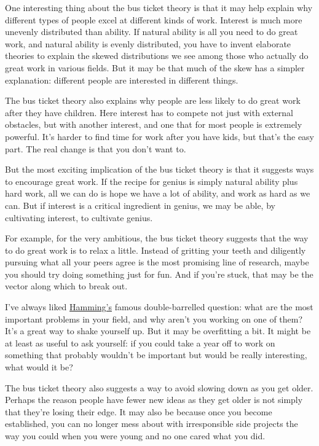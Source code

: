 \documentclass[12pt]{book}
\begin{document}
One interesting thing about the bus ticket theory is that it may help
explain why different types of people excel at different kinds of work.
Interest is much more unevenly distributed than ability. If natural
ability is all you need to do great work, and natural ability is evenly
distributed, you have to invent elaborate theories to explain the skewed
distributions we see among those who actually do great work in various
fields. But it may be that much of the skew has a simpler explanation:
different people are interested in different things.

The bus ticket theory also explains why people are less likely to do
great work after they have children. Here interest has to compete not
just with external obstacles, but with another interest, and one that
for most people is extremely powerful. It's harder to find time for work
after you have kids, but that's the easy part. The real change is that
you don't want to.

But the most exciting implication of the bus ticket theory is that it
suggests ways to encourage great work. If the recipe for genius is
simply natural ability plus hard work, all we can do is hope we have a
lot of ability, and work as hard as we can. But if interest is a
critical ingredient in genius, we may be able, by cultivating interest,
to cultivate genius.

For example, for the very ambitious, the bus ticket theory suggests that
the way to do great work is to relax a little. Instead of gritting your
teeth and diligently pursuing what all your peers agree is the most
promising line of research, maybe you should try doing something just
for fun. And if you're stuck, that may be the vector along which to
break out.

I've always liked \href{hamming.html}{Hamming's} famous double-barrelled
question: what are the most important problems in your field, and why
aren't you working on one of them? It's a great way to shake yourself
up. But it may be overfitting a bit. It might be at least as useful to
ask yourself: if you could take a year off to work on something that
probably wouldn't be important but would be really interesting, what
would it be?

The bus ticket theory also suggests a way to avoid slowing down as you
get older. Perhaps the reason people have fewer new ideas as they get
older is not simply that they're losing their edge. It may also be
because once you become established, you can no longer mess about with
irresponsible side projects the way you could when you were young and no
one cared what you did.
\end{document}

